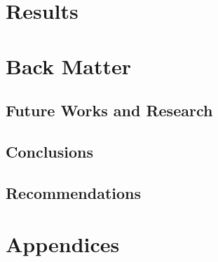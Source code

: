 \documentclass{book}
\begin{document}
\part{Results}
\label{part:results-1}
%
%


% 

\part{Back Matter}
\label{part:back-matter}

\chapter*{Future Works and Research}
\label{cha:future-works-rese}


\chapter*{Conclusions}
\label{cha:conclusions}


\chapter*{Recommendations}
\label{cha:recommendations}



\part{Appendices}
\label{part:appendices}


%
%



\appendix{}
\renewcommand{\thechapter}{\Alph{chapter}}

\end{document}
